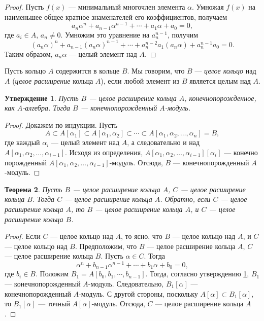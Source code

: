 \documentclass[12pt, titlepage, oneside]{amsbook}
\newtheorem{theorem}{Теорема}[chapter]
\newtheorem{claim}[theorem]{Утверждение}
\theoremstyle{definition}
\theoremstyle{remark}
\begin{document}
\begin{proof}
Пусть $f(x)$ --- минимальный многочлен элемента $\alpha$. Умножая $f(x)$ на наименьшее общее кратное знаменателей его коэффициентов, получаем $$a_n\alpha^n+a_{n-1}\alpha^{n-1}+\cdots+a_1\alpha+a_0=0,$$ где $a_i\in A$, $a_n\neq 0$. Умножим это уравнение на $a_n^{n-1}$, получим $$(a_n\alpha)^n+a_{n-1}(a_n\alpha)^{n-1}+\cdots+a_n^{n-2}a_1(a_n\alpha)+a_n^{n-1}a_0=0.$$ Таким образом, $a_n\alpha$ --- целый элемент над $A$.
\end{proof}

Пусть кольцо $A$ содержится в кольце $B$. Мы говорим, что $B$ --- \emph{целое кольцо} над $A$ (\emph{целое расширение} кольца $A$), если любой элемент из $B$ является целым над $A$.

\begin{claim}
\label{Zel3}
Пусть $B$ --- целое расширение кольца $A$, конечнопорожденное, как $A$-алгебра. Тогда $B$ --- конечнопорожденный $A$-модуль.
\end{claim}

\begin{proof}
Докажем по индукции. Пусть $$A\subset A[\alpha_1]\subset A[\alpha_1,\alpha_2]\subset\cdots\subset A[\alpha_1,\alpha_2,\ldots,\alpha_n]=B,$$ где каждый $\alpha_i$ --- целый элемент над $A$, а следовательно и над $A[\alpha_1,\alpha_2,\ldots,\alpha_{i-1}]$. Исходя из определения, $A[\alpha_1,\alpha_2,\ldots,\alpha_{i-1}][\alpha_i]$ --- конечно порожденный $A[\alpha_1,\alpha_2,\ldots,\alpha_{i-1}]$-модуль. Отсюда, $B$ --- конечнопорожденный $A$-модуль.
\end{proof}

\begin{theorem}
\label{Zel4}
Пусть $B$ --- целое расширение кольца $A$, $C$ --- целое расширение кольца $B$. Тогда $C$ --- целое расширение кольца $A$. Обратно, если $C$ --- целое расширение кольца $A$, то $B$ --- целое расширение кольца $A$, и $C$ --- целое расширение кольца $B$.
\end{theorem}

\begin{proof}
Если $C$ --- целое кольцо над $A$, то ясно, что $B$ --- целое кольцо над $A$, и $C$ --- целое кольцо над $B$. Предположим, что $B$ --- целое расширение кольца $A$, $C$ --- целое расширение кольца $B$. Пусть $\alpha\in C$. Тогда $$\alpha^n+b_{n-1}\alpha^{n-1}+\cdots+b_1\alpha+b_0=0,$$ где $b_i\in B$. Положим $B_1=A[b_0,b_1,\cdots,b_{n-1}]$. Тогда, согласно утверждению \ref{Zel3}, $B_1$ --- конечнопорожденный $A$-модуль. Следовательно, $B_1[\alpha]$ --- конечнопорожденный $A$-модуль. С другой стороны, поскольку $A[\alpha]\subset B_1[\alpha]$, то $B_1[\alpha]$ --- точный $A[\alpha]$-модуль. Отсюда, $C$ --- целое расширение кольца $A$.
\end{proof}
\end{document}
